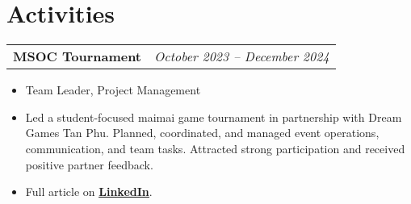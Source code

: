 \documentclass[a4paper,11pt]{article}
\makeatletter
\newenvironment{joblong}[2]
    {
    \begin{tabularx}{\linewidth}{@{}l r@{}}
    \textbf{#1} & #2 \\[2pt]
    \end{tabularx}
    \begin{itemize}[nosep,leftmargin=1.5em,itemsep=2pt,label=--]
    }
    {
    \end{itemize}
    }
\makeatother
\begin{document}
\section{Activities}
\begin{joblong}{MSOC Tournament}{\hspace*{0.54\linewidth}\small\textit{October 2023 -- December 2024}}
\item Team Leader, Project Management
\item Led a student-focused maimai game tournament in partnership with Dream Games Tan Phu. Planned, coordinated, and managed event operations, communication, and team tasks. Attracted strong participation and received positive partner feedback. 
\item Full article on \href{https://www.linkedin.com/feed/update/urn:li:activity:7300042302784233472/}{\textbf{\underline{LinkedIn}}}.
\end{joblong}



\vspace*{\fill}
\end{document}
